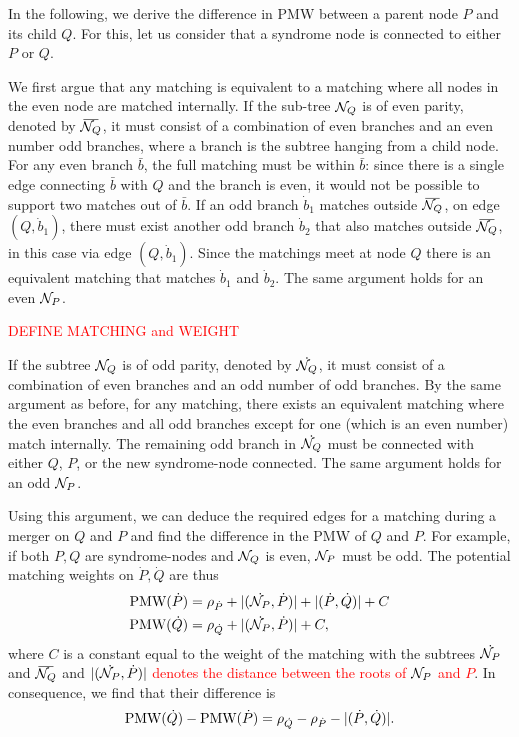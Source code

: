 In the following, we derive the difference in PMW between a parent node $P$ and its child $Q$. For this, let us consider that a syndrome node is connected to either $P$ or $Q$. 

We first argue that any matching is equivalent to a matching where all nodes in the even node are matched internally. If the sub-tree $\mathcal{N}_Q$ is of even parity, denoted by $\overbar{\nset_Q}$, it must consist of a combination of even branches and an even number odd branches, where a branch is the subtree hanging from a child node. %
For any even branch $\bar{b}$, the full matching must be within $\bar{b}$: since there is a single edge connecting $\bar b$ with $Q$ and the branch is even, it would not be possible to support two matches out of $\bar{b}$. 
If an odd branch $\dot{b}_1$ matches outside $\overbar{\nset_Q}$, on edge $(Q, \dot{b}_1)$, there must exist another odd branch $\dot{b}_2$ that also matches outside $\overbar{\nset_Q}$, in this case via edge $(Q, \dot{b}_1)$. Since the matchings meet at node $Q$ there is an equivalent matching that matches $\dot{b}_1$ and $\dot{b}_2$. 
The same argument holds for an even $\mathcal{N}_P$.

\textcolor{red}{DEFINE MATCHING and WEIGHT}

If the subtree $\mathcal{N}_Q$ is of odd parity, denoted by $\dot{\mathcal{N}_Q}$, it must consist of a combination of even branches and an odd number of odd branches. By the same argument as before, for any matching, there exists an equivalent matching where the even branches and all odd branches except for one (which is an even number) match internally. 
The remaining odd branch in $\dot{\mathcal{N}_Q}$ must be connected with either $Q$, $P$, or the new syndrome-node connected. 
The same argument holds for an odd $\mathcal{N}_P$.

Using this argument, we can deduce the required edges for a matching during a merger on $Q$ and $P$ and find the difference in the PMW of $Q$ and $P$. For example, if both $P,Q$ are syndrome-nodes and $\mathcal{N}_Q$ is even, $\mathcal{N}_P$ must be odd. The potential matching weights on $\dot{P},\dot{Q}$ are thus
\begin{align*}
  \text{PMW}(\dot{P}) &= \rho_{\dot{P}} + \lvert(\dot{\mathcal{N}_P},\dot{P})\rvert + \lvert(\dot{P}, \dot{Q})\rvert + C \\
  \text{PMW}(\dot{Q}) &= \rho_{\dot{Q}} + \lvert(\dot{\mathcal{N}_P},\dot{P})\rvert + C,
\end{align*}
where $C$ is a constant equal to the weight of the matching with the subtrees $\dot{\mathcal{N}_P}$ and $\overbar{\nset_Q}$ and \textcolor{red}{$\lvert(\dot{\mathcal{N}_P},\dot{P})\rvert$ denotes the distance between the roots of $\mathcal{N}_P$ and $P$}. In consequence, we find that their difference is 
\begin{equation*}
  \text{PMW}(\dot{Q}) - \text{PMW}(\dot{P}) = \rho_{\dot{Q}} - \rho_{\dot{P}} - \lvert(\dot{P}, \dot{Q})\rvert.
\end{equation*}

